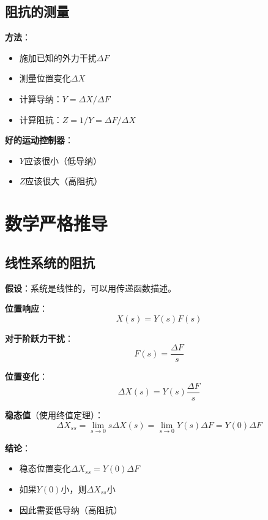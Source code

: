 \documentclass[12pt,a4paper]{article}
\begin{document}
\subsection{阻抗的测量}

\textbf{方法}：
\begin{itemize}
\item 施加已知的外力干扰$\Delta F$
\item 测量位置变化$\Delta X$
\item 计算导纳：$Y = \Delta X / \Delta F$
\item 计算阻抗：$Z = 1/Y = \Delta F / \Delta X$
\end{itemize}

\textbf{好的运动控制器}：
\begin{itemize}
\item $Y$应该很小（低导纳）
\item $Z$应该很大（高阻抗）
\end{itemize}

\section{数学严格推导}

\subsection{线性系统的阻抗}

\textbf{假设}：系统是线性的，可以用传递函数描述。

\textbf{位置响应}：
\begin{equation}
X(s) = Y(s)F(s)
\end{equation}

\textbf{对于阶跃力干扰}：
\begin{equation}
F(s) = \frac{\Delta F}{s}
\end{equation}

\textbf{位置变化}：
\begin{equation}
\Delta X(s) = Y(s) \frac{\Delta F}{s}
\end{equation}

\textbf{稳态值}（使用终值定理）：
\begin{equation}
\Delta X_{ss} = \lim_{s \to 0} s \Delta X(s) = \lim_{s \to 0} Y(s) \Delta F = Y(0) \Delta F
\end{equation}

\textbf{结论}：
\begin{itemize}
\item 稳态位置变化$\Delta X_{ss} = Y(0) \Delta F$
\item 如果$Y(0)$小，则$\Delta X_{ss}$小
\item 因此需要低导纳（高阻抗）
\end{itemize}
\end{document}
